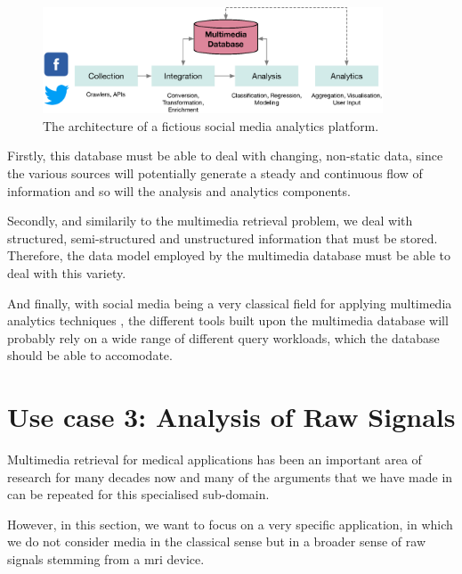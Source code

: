 \begin{figure}[tb]
    \centering
    \includegraphics[width=0.90\textwidth]{figures/social-media-architecture.eps}
    \caption{The architecture of a fictious social media analytics platform.}
    \label{figure:social-media}
\end{figure}

Firstly, this database must be able to deal with changing, non-static data, since the various sources will potentially generate a steady and continuous flow of information and so will the analysis and analytics components.

Secondly, and similarily to the multimedia retrieval problem, we deal with structured, semi-structured and unstructured information that must be stored. Therefore, the data model employed by the multimedia database must be able to deal with this variety. 

And finally, with social media being a very classical field for applying multimedia analytics techniques \cite{Pouyanfar:2018,Jonson:2016}, the different tools built upon the multimedia database will probably rely on a wide range of different query workloads, which the database should be able to accomodate.

\section{Use case 3: Analysis of Raw Signals}
\label{section:application_mrf}

Multimedia retrieval for medical applications has been an important area of research for many decades now \cite{Mueller:2017Retrieval,Mueller:2004Review} and many of the arguments that we have made in  can be repeated for this specialised sub-domain.

However, in this section, we want to focus on a very specific application, in which we do not consider media in the classical sense but in a broader sense of raw signals stemming from a \acrfull{mri} device.

